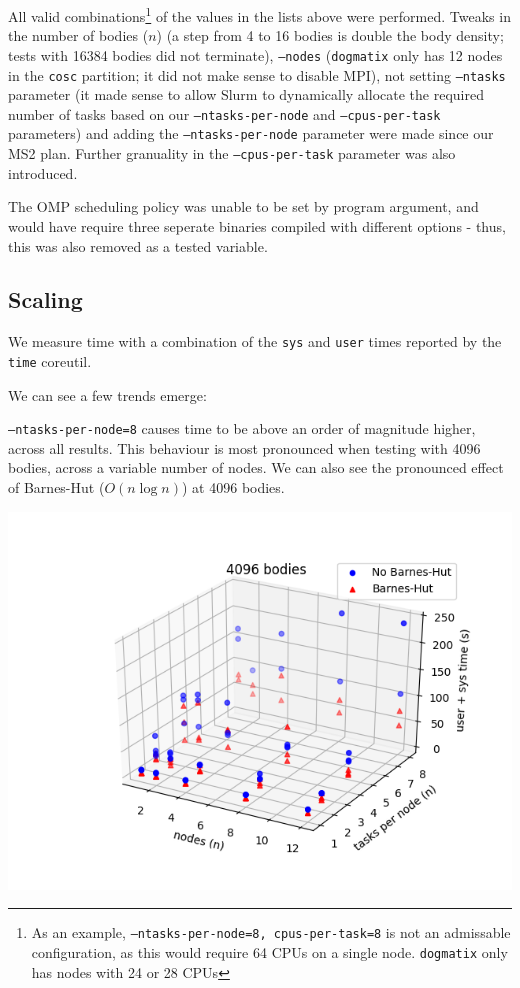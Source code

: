 \documentclass[11pt,a4paper]{article}
\begin{document}
All valid combinations\footnote{As an example, \texttt{--ntasks-per-node=8, cpus-per-task=8} is not an admissable configuration, as this would require 64 CPUs on a single node. \texttt{dogmatix} only has nodes with 24 or 28 CPUs} of the values in the lists above were performed. Tweaks in the number of bodies ($n$) (a step from 4 to 16 bodies is double the body density; tests with 16384 bodies did not terminate), \texttt{--nodes} (\texttt{dogmatix} only has 12 nodes in the \texttt{cosc} partition; it did not make sense to disable MPI), not setting \texttt{--ntasks} parameter (it made sense to allow Slurm to dynamically allocate the required number of tasks based on our \texttt{--ntasks-per-node} and \texttt{--cpus-per-task} parameters) and adding the \texttt{--ntasks-per-node} parameter were made since our MS2 plan. Further granuality in the \texttt{--cpus-per-task} parameter was also introduced.

The OMP scheduling policy was unable to be set by program argument, and would have require three seperate binaries compiled with different options - thus, this was also removed as a tested variable.


\subsection*{Scaling}

We measure time with a combination of the \texttt{sys} and \texttt{user} times reported by the \texttt{time} coreutil. 

We can see a few trends emerge:

\texttt{--ntasks-per-node=8} causes time to be above an order of magnitude higher, across all results. This behaviour is most pronounced when testing with 4096 bodies, across a variable number of nodes. We can also see the pronounced effect of Barnes-Hut ($O(n \log n)$) at 4096 bodies.


\includegraphics[width=14.2cm]{4096-nodes-tasksPerNode}
\end{document}

